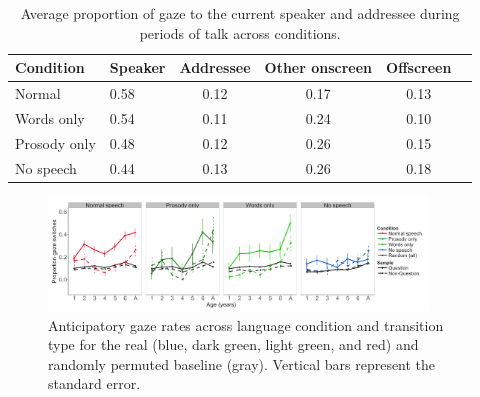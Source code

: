\documentclass[authoryear, 12pt]{elsarticle}
\begin{document}
\begin{table}[h]
\begin{center}
  \begin{tabular}{llcccc}
    \hline
    Condition & Speaker & Addressee & Other onscreen & Offscreen\\ 
    \hline
    Normal & 0.58 & 0.12 & 0.17 & 0.13 \\ 
    Words only & 0.54 & 0.11 & 0.24 & 0.10 \\ 
    Prosody only & 0.48 & 0.12 & 0.26 & 0.15 \\ 
    No speech & 0.44 & 0.13 & 0.26 & 0.18 \\
    \hline
  \end{tabular}
\end{center}
  \caption{Average proportion of gaze to the current speaker and addressee during periods of talk across conditions.}
\label{tab:look_e2b}
\end{table}


\begin{figure}[h]
\begin{center}
\includegraphics[width=0.9\textwidth]{figures/E2-samples-by-lang-groups-trans-types.png}
\end{center}
\caption{Anticipatory gaze rates across language condition and transition type for the real (blue, dark green, light green, and red) and randomly permuted baseline (gray). Vertical bars represent the standard error.} 
\label{fig:E2-randvsreal}
\end{figure}
\end{document}
